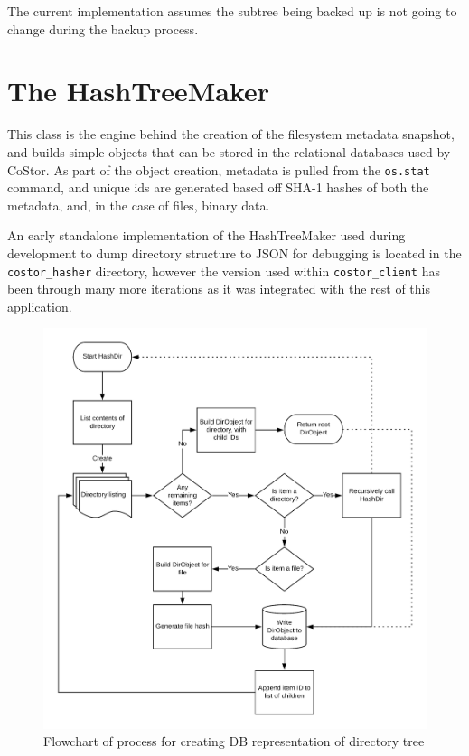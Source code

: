 \documentclass[bsc,frontabs,twoside,singlespacing,parskip,deptreport]{infthesis}     %
\begin{document}
The current implementation assumes the subtree being backed up is not going to change during the
backup process.

\clearpage

\section{The HashTreeMaker}

This class is the engine behind the creation of the filesystem metadata snapshot, and builds
simple objects that can be stored in the relational databases used by CoStor. As part of the 
object creation, metadata is pulled from the \texttt{os.stat} command, and unique ids are generated
based off SHA-1 hashes of both the metadata, and, in the case of files, binary data.

An early standalone implementation of the HashTreeMaker used during development to dump directory
structure to JSON for debugging is located in the \texttt{costor\_hasher} directory, however the
version used within \texttt{costor\_client} has been through many more iterations as it was integrated
with the rest of this application.

\begin{figure}[b]
	\includegraphics[width=\linewidth]{img/hasherflow.png}
	\caption{Flowchart of process for creating DB representation of directory tree}
	\label{fig:hasherflow}
\end{figure}
\end{document}

